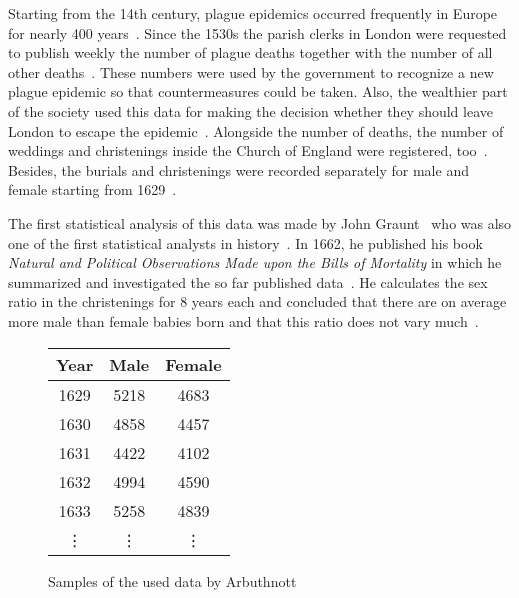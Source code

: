 Starting from the 14th century, plague epidemics occurred frequently in Europe for nearly 400 years~\cite[p. 82]{hald1}. Since the 1530s the parish clerks in London were requested to publish weekly the number of plague deaths together with the number of all other deaths~\cite[p. 82]{hald1}. These numbers were used by the government to recognize a new plague epidemic so that countermeasures could be taken. Also, the wealthier part of the society used this data for making the decision whether they should leave London to escape the epidemic~\cite[pp. 82-83]{hald1}. Alongside the number of deaths, the number of weddings and christenings inside the Church of England were registered, too~\cite[p. 83]{hald1}. Besides, the burials and christenings were recorded separately for male and female starting from 1629~\cite[p. 83]{hald1}.

The first statistical analysis of this data was made by John Graunt~\cite[p. 83]{hald1} who was also one of the first statistical analysts in history~\cite[p. 81]{hald1}. In 1662, he published his book \emph{Natural and Political Observations Made upon the Bills of Mortality} in which he summarized and investigated the so far published data~\cite[pp. 81-105]{hald1}. He calculates the sex ratio in the christenings for 8 years each and concluded that there are on average more male than female babies born and that this ratio does not vary much~\cite[pp. 92-93]{hald1}.


\begin{figure}
  \begin{center}
    \begin{tabular}{c|c|c}
      Year & Male & Female \\
      \hline
      1629 & 5218 & 4683 \\
      1630 & 4858 & 4457 \\
      1631 & 4422 & 4102 \\
      1632 & 4994 & 4590 \\
      1633 & 5258 & 4839 \\
      \vdots & \vdots & \vdots
    \end{tabular}

    \caption{Samples of the used data by Arbuthnott~\cite[p. 276]{hald1}}
  \end{center}
\end{figure}

